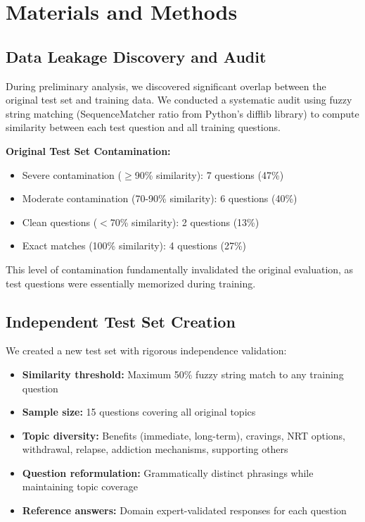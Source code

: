 \documentclass[10pt,letterpaper]{article}
\begin{document}
\section*{Materials and Methods}

\subsection*{Data Leakage Discovery and Audit}
During preliminary analysis, we discovered significant overlap between the original test set and training data. We conducted a systematic audit using fuzzy string matching (SequenceMatcher ratio from Python's difflib library) to compute similarity between each test question and all training questions.

\textbf{Original Test Set Contamination:}
\begin{itemize}
    \item Severe contamination ($\geq$90\% similarity): 7 questions (47\%)
    \item Moderate contamination (70-90\% similarity): 6 questions (40\%)
    \item Clean questions ($<$70\% similarity): 2 questions (13\%)
    \item Exact matches (100\% similarity): 4 questions (27\%)
\end{itemize}

This level of contamination fundamentally invalidated the original evaluation, as test questions were essentially memorized during training.

\subsection*{Independent Test Set Creation}
We created a new test set with rigorous independence validation:
\begin{itemize}
    \item \textbf{Similarity threshold:} Maximum 50\% fuzzy string match to any training question
    \item \textbf{Sample size:} 15 questions covering all original topics
    \item \textbf{Topic diversity:} Benefits (immediate, long-term), cravings, NRT options, withdrawal, relapse, addiction mechanisms, supporting others
    \item \textbf{Question reformulation:} Grammatically distinct phrasings while maintaining topic coverage
    \item \textbf{Reference answers:} Domain expert-validated responses for each question
\end{itemize}
\end{document}
